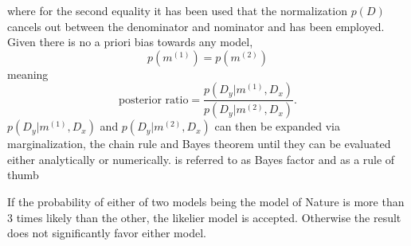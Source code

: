 where for the second equality it has been used that the normalization $p(D)$ cancels out between the denominator and nominator and  has been employed. Given there is no a priori bias towards any model, 
\begin{equation} 
	p(m^{(1)}) = p(m^{(2)}) 
\end{equation} 
meaning 
\begin{equation} 
	\text{posterior ratio} = \frac{p(D_y|m^{(1)},D_x)}{p(D_y|m^{(2)},D_x)}. 
	\label{eq:bayes_factor} 
\end{equation} 
$p(D_y|m^{(1)},D_x)$ and $p(D_y|m^{(2)},D_x)$ can then be expanded via marginalization, the chain rule and Bayes theorem until they can be evaluated either analytically or numerically.  is referred to as Bayes factor and as a rule of thumb 

\begin{definition} 
	If the probability of either of two models being the model of Nature is more than 3 times likely than the other, the likelier model is accepted. Otherwise the result does not significantly favor either model. 
\end{definition}